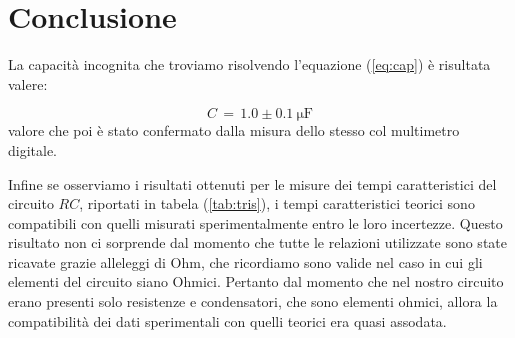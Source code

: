 \section*{Conclusione}

La capacità incognita che troviamo risolvendo l'equazione (\ref{eq:cap}) è risultata valere:

\begin{equation}
  C \,=\, 1.0 \pm 0.1 \: \si{\micro\farad}
\end{equation}
%
valore che poi è stato confermato dalla misura dello stesso col multimetro digitale.

Infine se osserviamo i risultati ottenuti per le misure dei tempi caratteristici del circuito $RC$, riportati in tabela (\ref{tab:tris}), i tempi caratteristici teorici sono compatibili con quelli misurati sperimentalmente entro le loro incertezze.
Questo risultato non ci sorprende dal momento che tutte le relazioni utilizzate sono state ricavate grazie alleleggi di Ohm, che ricordiamo sono valide nel caso in cui gli elementi del circuito siano Ohmici. Pertanto dal momento che nel nostro circuito erano presenti solo resistenze e condensatori, che sono elementi ohmici, allora la compatibilità dei dati sperimentali con quelli teorici era quasi assodata.  
